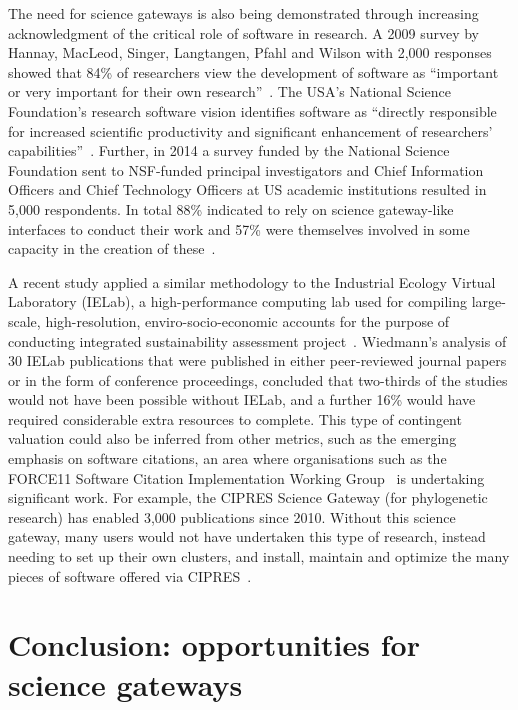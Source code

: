 \documentclass[review]{elsarticle}
\begin{document}
The need for science gateways is also being demonstrated through increasing acknowledgment of the critical role of software in research. A 2009 survey by Hannay, MacLeod, Singer, Langtangen, Pfahl and Wilson with 2,000 responses showed that 84\% of researchers view the development of software as ``important or very important for their own research''~\cite{Hannay2009-36}. The USA's National Science Foundation's research software vision identifies software as ``directly responsible for increased scientific productivity and significant enhancement of researchers' capabilities''~\cite{nsf-si-17}. 
Further, in 2014 a survey funded by the National Science Foundation sent to NSF-funded principal investigators and Chief Information Officers and Chief Technology Officers at US academic institutions resulted in  5,000 respondents. In total 88\% indicated to rely on science gateway-like interfaces to conduct their work and 57\% were themselves involved in some capacity in the creation of these~\cite{Lawrence2015-37}.

A recent study applied a similar methodology to the Industrial Ecology Virtual Laboratory (IELab), a high-performance computing lab used for compiling large-scale, high-resolution, enviro-socio-economic accounts for the purpose of conducting integrated sustainability assessment project~\cite{Wiedmann2017-38}. 
Wiedmann's analysis of 30 IELab publications that were published in either peer-reviewed journal papers or in the form of conference proceedings, concluded that two-thirds of the studies would not have been possible without IELab, and a further 16\% would have required considerable extra resources to complete. 
This type of contingent valuation could also be inferred from other metrics, such as the emerging emphasis on software citations, an area where organisations such as the FORCE11 Software Citation Implementation Working Group~\cite{force11-39} is undertaking significant work. For example, the CIPRES Science Gateway (for phylogenetic research) has enabled 3,000 publications since 2010. Without this science gateway, many users would not have undertaken this type of research, instead needing to set up their own clusters, and install, maintain and optimize the many pieces of software offered via CIPRES~\cite{Miller2012-40}. 

\section{Conclusion: opportunities for science gateways}
\end{document}
